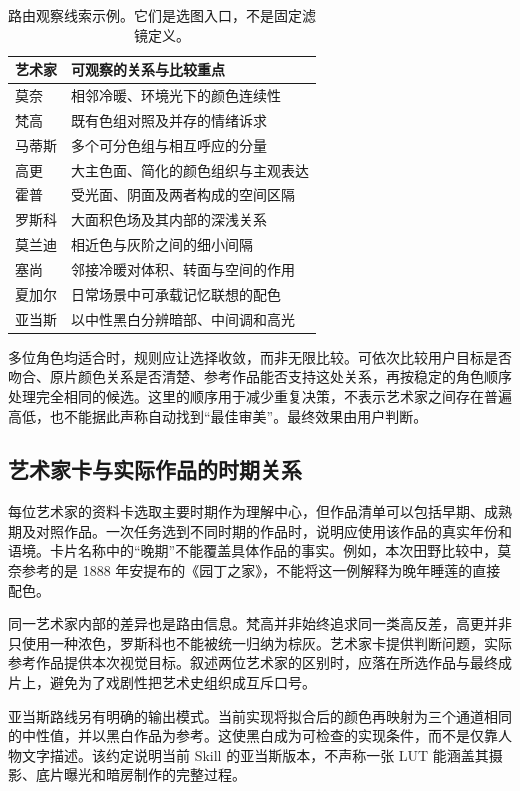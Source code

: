 \begin{table}[t]
\caption{路由观察线索示例。它们是选图入口，不是固定滤镜定义。}
\label{tab:routing}
\centering\small
\begin{tabular}{p{}p{}}
\hline
艺术家 & 可观察的关系与比较重点\\\hline
莫奈 & 相邻冷暖、环境光下的颜色连续性\\
梵高 & 既有色组对照及并存的情绪诉求\\
马蒂斯 & 多个可分色组与相互呼应的分量\\
高更 & 大主色面、简化的颜色组织与主观表达\\
霍普 & 受光面、阴面及两者构成的空间区隔\\
罗斯科 & 大面积色场及其内部的深浅关系\\
莫兰迪 & 相近色与灰阶之间的细小间隔\\
塞尚 & 邻接冷暖对体积、转面与空间的作用\\
夏加尔 & 日常场景中可承载记忆联想的配色\\
亚当斯 & 以中性黑白分辨暗部、中间调和高光\\\hline
\end{tabular}
\end{table}

多位角色均适合时，规则应让选择收敛，而非无限比较。可依次比较用户目标是否吻合、原片颜色关系是否清楚、参考作品能否支持这处关系，再按稳定的角色顺序处理完全相同的候选。这里的顺序用于减少重复决策，不表示艺术家之间存在普遍高低，也不能据此声称自动找到“最佳审美”。最终效果由用户判断。

\subsection{艺术家卡与实际作品的时期关系}
每位艺术家的资料卡选取主要时期作为理解中心，但作品清单可以包括早期、成熟期及对照作品。一次任务选到不同时期的作品时，说明应使用该作品的真实年份和语境。卡片名称中的“晚期”不能覆盖具体作品的事实。例如，本次田野比较中，莫奈参考的是 1888 年安提布的《园丁之家》，不能将这一例解释为晚年睡莲的直接配色\cite{monet}。

同一艺术家内部的差异也是路由信息。梵高并非始终追求同一类高反差，高更并非只使用一种浓色，罗斯科也不能被统一归纳为棕灰。艺术家卡提供判断问题，实际参考作品提供本次视觉目标。叙述两位艺术家的区别时，应落在所选作品与最终成片上，避免为了戏剧性把艺术史组织成互斥口号。

亚当斯路线另有明确的输出模式。当前实现将拟合后的颜色再映射为三个通道相同的中性值，并以黑白作品为参考。这使黑白成为可检查的实现条件，而不是仅靠人物文字描述。该约定说明当前 Skill 的亚当斯版本，不声称一张 LUT 能涵盖其摄影、底片曝光和暗房制作的完整过程。

